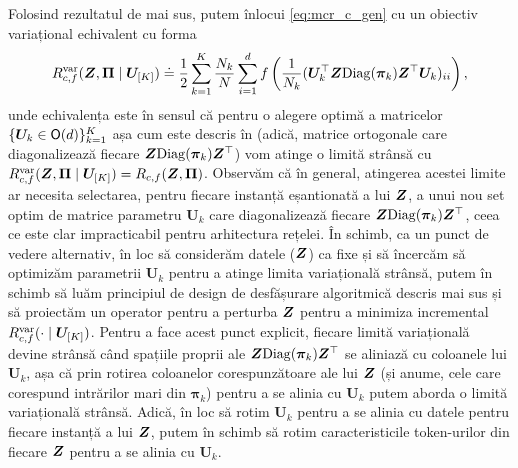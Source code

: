 \documentclass[../../book-main_ro.tex]{subfiles}
\begin{document}
Folosind rezultatul de mai sus, putem înlocui \eqref{eq:mcr_c_gen} cu un obiectiv variațional echivalent cu forma
\vspace{-2mm}
\begin{equation}
    \label{eq:var_comp}
    R^{\rm var}_{c,f} (\bm{Z},\bm \Pi \mid \bm U_{[K]}) \doteq \frac{1}{2}\sum_{k=1}^K \frac{N_k}{N} \sum_{i=1}^{d} f\left(\frac{1}{N_k} (\bm U_{k}^{\top} \bm{Z} \mathrm{Diag}(\bm \pi_k) \bm Z^{\top} \bm U_{k})_{ii} \right),
\end{equation}
unde echivalența este în sensul că pentru o alegere optimă a matricelor $\{ \bm U_k \in \mathsf{O}(d)\}_{k=1}^K$ așa cum este descris în  (adică, matrice ortogonale care diagonalizează fiecare $\bm{Z} \mathrm{Diag}(\bm \pi_k) \bm{Z}^\top $) vom atinge o limită strânsă cu $ R^{\rm var}_{c,f} (\bm{Z},\bm \Pi \mid \bm U_{[K]}) = R_{c,f} (\bm{Z},\bm \Pi)$. Observăm că în general, atingerea acestei limite ar necesita selectarea, pentru fiecare instanță eșantionată a lui $\bm{Z}$, a unui nou set optim de matrice parametru $\bm U_{k}$ care diagonalizează fiecare $\bm{Z}\mathrm{Diag}(\bm \pi_{k})\bm{Z}^{\top}$, ceea ce este clar impracticabil pentru arhitectura rețelei.
În schimb, ca un punct de vedere alternativ, în loc să considerăm datele ($\bm{Z}$) ca fixe și să încercăm să optimizăm parametrii $\bm U_k$ pentru a atinge limita variațională strânsă, putem în schimb să luăm principiul de design de desfășurare algoritmică descris mai sus și să proiectăm un operator pentru a perturba $\bm{Z}$ pentru a minimiza incremental $R_{c, f}^{\rm var}(\cdot \mid \bm U_{[K]})$. Pentru a face acest punct explicit, fiecare limită variațională devine strânsă când spațiile proprii ale $\bm{Z} \mathrm{Diag}(\bm \pi_k) \bm{Z}
^\top$ se aliniază cu coloanele lui $\bm U_k$, așa că prin rotirea coloanelor corespunzătoare ale lui $\bm{Z}$ (și anume, cele care corespund intrărilor mari din $\bm \pi_k$) pentru a se alinia cu $\bm U_k$ putem aborda o limită variațională strânsă. Adică, în loc să rotim $\bm U_k$ pentru a se alinia cu datele pentru fiecare instanță a lui $\bm{Z}$, putem în schimb să rotim caracteristicile token-urilor din fiecare $\bm{Z}$ pentru a se alinia cu $\bm U_k$.
\end{document}
